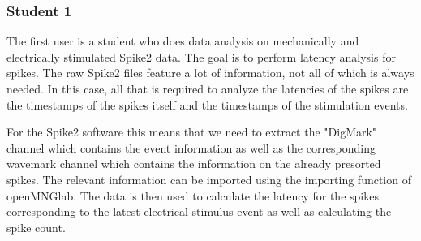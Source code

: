 \subsubsection{Student 1}

The first user is a student who does data analysis on mechanically and electrically stimulated Spike2 data. The goal is to perform latency analysis for spikes. The raw Spike2 files feature a lot of information, not all of which is always needed. In this case, all that is required to analyze the latencies of the spikes are the timestamps of the spikes itself and the timestamps of the stimulation events. 

For the Spike2 software this means that we need to extract the "DigMark" channel which contains the event information as well as the corresponding wavemark channel which contains the information on the already presorted spikes. The relevant information can be imported using the importing function of openMNGlab. The data is then used to calculate the latency for the spikes corresponding to the latest electrical stimulus event as well as calculating the spike count.

